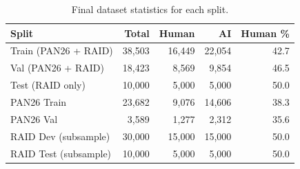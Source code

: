 \begin{table}[t]
\caption{Final dataset statistics for each split.}
\label{tab:dataset_stats}
\begin{tabular}{lrrrr}
\toprule
\textbf{Split} & \textbf{Total} & \textbf{Human} & \textbf{AI} & \textbf{Human \%} \\
\midrule
Train (PAN26 + RAID) & 38,503 & 16,449 & 22,054 & 42.7 \\
Val (PAN26 + RAID)   & 18,423 &  8,569 &  9,854 & 46.5 \\
Test (RAID only)     & 10,000 &  5,000 &  5,000 & 50.0 \\
\midrule
PAN26 Train          & 23,682 &  9,076 & 14,606 & 38.3 \\
PAN26 Val            &  3,589 &  1,277 &  2,312 & 35.6 \\
RAID Dev (subsample) & 30,000 & 15,000 & 15,000 & 50.0 \\
RAID Test (subsample)& 10,000 &  5,000 &  5,000 & 50.0 \\
\bottomrule
\end{tabular}
\end{table}
